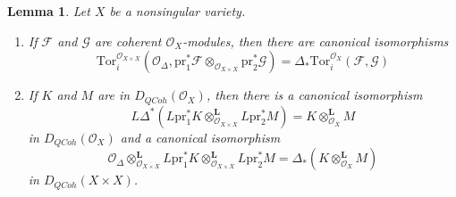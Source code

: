 \documentclass{stacks-project}
\theoremstyle{plain}
\newtheorem{lemma}[subsection]{Lemma}
\theoremstyle{definition}
\theoremstyle{remark}
\numberwithin{equation}{subsection}
\def\QCoh{\mathit{QCoh}}
\begin{document}
\begin{lemma}
\label{lemma-tor-and-diagonal}
Let $X$ be a nonsingular variety.
\begin{enumerate}
\item If $\mathcal{F}$ and $\mathcal{G}$ are coherent $\mathcal{O}_X$-modules,
then there are canonical isomorphisms
$$
\text{Tor}_i^{\mathcal{O}_{X \times X}}(\mathcal{O}_\Delta,
\text{pr}_1^*\mathcal{F} \otimes_{\mathcal{O}_{X \times X}}
\text{pr}_2^*\mathcal{G})
=
\Delta_*\text{Tor}_i^{\mathcal{O}_X}(\mathcal{F}, \mathcal{G})
$$
\item If $K$ and $M$ are in $D_\QCoh(\mathcal{O}_X)$, then
there is a canonical isomorphism
$$
L\Delta^* \left(
L\text{pr}_1^*K \otimes_{\mathcal{O}_{X \times X}}^\mathbf{L} L\text{pr}_2^*M
\right)
= K \otimes_{\mathcal{O}_X}^\mathbf{L} M
$$
in $D_\QCoh(\mathcal{O}_X)$ and a canonical isomorphism
$$
\mathcal{O}_\Delta \otimes_{\mathcal{O}_{X \times X}}^\mathbf{L}
L\text{pr}_1^*K \otimes_{\mathcal{O}_{X \times X}}^\mathbf{L} L\text{pr}_2^*M
= \Delta_*(K \otimes_{\mathcal{O}_X}^\mathbf{L} M)
$$
in $D_\QCoh(X \times X)$.
\end{enumerate}
\end{lemma}
\end{document}
